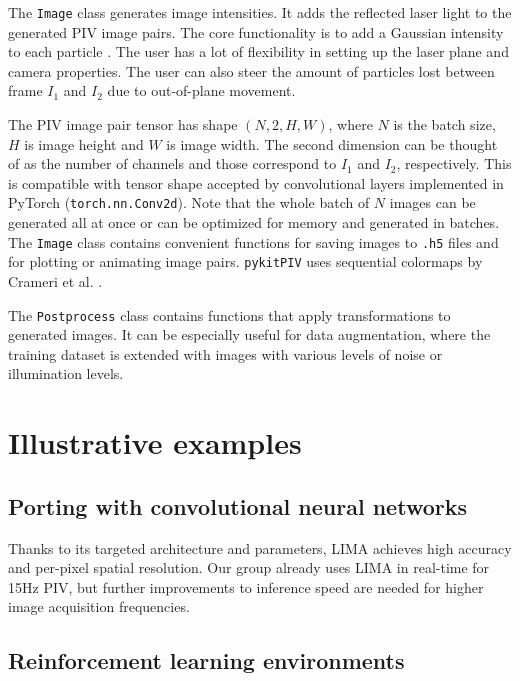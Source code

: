 \documentclass[a4paper,fleqn]{cas-dc}
\newcommand{ \kamila}[1]{\color{blue}{Kamila: #1} \color{black}}
\begin{document}
The \texttt{Image} class generates image intensities. It adds the reflected laser light to the generated PIV image pairs. The core functionality is to add a Gaussian intensity to each particle \citep{olsen2000out, rabault2017performing}. The user has a lot of flexibility in setting up the laser plane and camera properties. The user can also steer the amount of particles lost between frame $I_1$ and $I_2$ due to out-of-plane movement.

The PIV image pair tensor has shape $(N, 2, H, W)$, where $N$ is the batch size, $H$ is image height and $W$ is image width. The second dimension can be thought of as the number of channels and those correspond to $I_1$ and $I_2$, respectively. This is compatible with tensor shape accepted by convolutional layers implemented in PyTorch (\texttt{torch.nn.Conv2d}). Note that the whole batch of $N$ images can be generated all at once or can be optimized for memory and generated in batches. The \texttt{Image} class contains convenient functions for saving images to \texttt{.h5} files and for plotting or animating image pairs. \texttt{pykitPIV} uses sequential colormaps by Crameri et al. \cite{crameri2020misuse}.

The \texttt{Postprocess} class contains functions that apply transformations to generated images. It can be especially useful for data augmentation, where the training dataset is extended with images with various levels of noise or illumination levels.

\section{Illustrative examples} \label{sec:examples}

\subsection{Porting with convolutional neural networks}

\kamila{Here we can describe what can be achieved in terms of training a CNN.}

Thanks to its targeted architecture and parameters, LIMA achieves high accuracy and per-pixel spatial resolution. Our group already uses LIMA in real-time for 15Hz PIV, but further improvements to inference speed are needed for higher image acquisition frequencies.

\subsection{Reinforcement learning environments}
\end{document}
